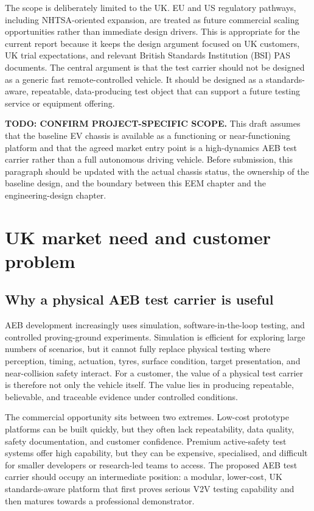 The scope is deliberately limited to the UK. EU and US regulatory pathways, including NHTSA-oriented expansion, are treated as future commercial scaling opportunities rather than immediate design drivers. This is appropriate for the current report because it keeps the design argument focused on UK customers, UK trial expectations, and relevant British Standards Institution (BSI) PAS documents. The central argument is that the test carrier should not be designed as a generic fast remote-controlled vehicle. It should be designed as a standards-aware, repeatable, data-producing test object that can support a future testing service or equipment offering.

\textbf{TODO: CONFIRM PROJECT-SPECIFIC SCOPE.} This draft assumes that the baseline EV chassis is available as a functioning or near-functioning platform and that the agreed market entry point is a high-dynamics AEB test carrier rather than a full autonomous driving vehicle. Before submission, this paragraph should be updated with the actual chassis status, the ownership of the baseline design, and the boundary between this EEM chapter and the engineering-design chapter.

\section{UK market need and customer problem}

\subsection{Why a physical AEB test carrier is useful}

AEB development increasingly uses simulation, software-in-the-loop testing, and controlled proving-ground experiments. Simulation is efficient for exploring large numbers of scenarios, but it cannot fully replace physical testing where perception, timing, actuation, tyres, surface condition, target presentation, and near-collision safety interact. For a customer, the value of a physical test carrier is therefore not only the vehicle itself. The value lies in producing repeatable, believable, and traceable evidence under controlled conditions.

The commercial opportunity sits between two extremes. Low-cost prototype platforms can be built quickly, but they often lack repeatability, data quality, safety documentation, and customer confidence. Premium active-safety test systems offer high capability, but they can be expensive, specialised, and difficult for smaller developers or research-led teams to access. The proposed AEB test carrier should occupy an intermediate position: a modular, lower-cost, UK standards-aware platform that first proves serious V2V testing capability and then matures towards a professional demonstrator.

